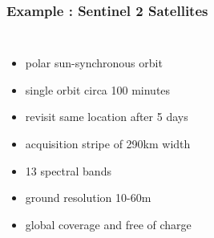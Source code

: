 \begin{frame}
\frametitle{Example \sat: Sentinel 2 Satellites}

%	

\begin{columns}

\Large
\begin{itemize}
\item<1-> polar sun-synchronous orbit
\item<2-> single orbit circa 100 minutes
\item<3-> revisit same location after 5 days
\item<4-> acquisition stripe of 290km width
\item<5-> 13 spectral bands
\item<6-> ground resolution 10-60m
\item<7-> global coverage and free of charge
\end{itemize}


\end{columns}
\end{frame}

